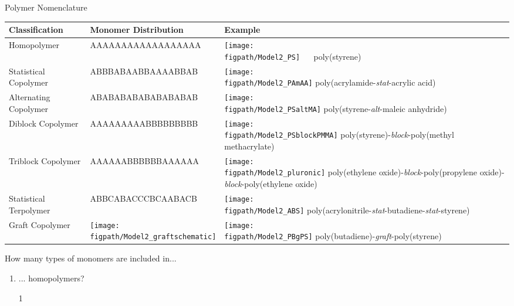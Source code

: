 \begin{activity}{Polymer Nomenclature}
\begin{model}[Composition]
	{\renewcommand{\arraystretch}{1.75}
	\begin{tabular}{m{0.78in}m{2in}m{2.5in}}
		\hline
		Classification & Monomer Distribution & Example\\
		\hline
		Homopolymer & AAAAAAAAAAAAAAAAAA & \texttt{[image: \\figpath/Model2\_PS]} ~~ poly(styrene) \\\hline
		Statistical Copolymer & ABBBABAABBAAAABBAB & \texttt{[image: \\figpath/Model2\_PAmAA]} \newline poly(acrylamide-\emph{stat}-acrylic acid)\\\hline
		Alternating Copolymer & ABABABABABABABABAB & \texttt{[image: \\figpath/Model2\_PSaltMA]} \newline poly(styrene-\emph{alt}-maleic anhydride)\\\hline
		Diblock Copolymer & AAAAAAAAABBBBBBBBB & \texttt{[image: \\figpath/Model2\_PSblockPMMA]} \newline poly(styrene)-\emph{block}-poly(methyl methacrylate)\\\hline
		Triblock Copolymer & AAAAAABBBBBBAAAAAA & \texttt{[image: \\figpath/Model2\_pluronic]} \newline poly(ethylene oxide)-\emph{block}-poly(propyl\-ene oxide)-\emph{block}-poly(ethylene oxide) \\\hline
		Statistical Terpolymer & ABBCABACCCBCAABACB & \texttt{[image: \\figpath/Model2\_ABS]} \newline poly(acrylonitrile-\emph{stat}-butadiene-\emph{stat}-styrene) \\\hline
		Graft Copolymer & \texttt{[image: \\figpath/Model2\_graftschematic]} & \texttt{[image: \\figpath/Model2\_PBgPS]} \newline poly(butadiene)-\emph{graft}-poly(styrene) 
	\end{tabular}
	}

\end{model}

\begin{ctqs}

	\question How many types of monomers are included in...
	
		\begin{enumerate}
			\item ... homopolymers?
			
				\begin{solution}[0.25in]{}
				1
				\end{solution}
			

\end{enumerate}
\end{ctqs}
\end{activity}
